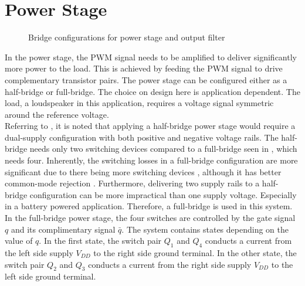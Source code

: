 \section{Power Stage} \label{sec:power_stage}
\begin{figure}[htbp]
	\centering
	\begin{subfigure}[b]{0.5\textwidth}
		\centering
		\begin{circuitikz}[>=Triangle, scale=0.8, font=\footnotesize]
			
		\end{circuitikz}
		\label{fig:power_stage_halfbridge}
	\end{subfigure}%
	\begin{subfigure}[b]{0.5\textwidth}
		\centering
		\begin{circuitikz}[>=Triangle, scale=0.8, font=\footnotesize]
			
		\end{circuitikz}
		\label{fig:power_stage_fullbridge}
	\end{subfigure}
	\caption{Bridge configurations for power stage and output filter}
	\label{fig:power_stage_top}
\end{figure}

In the power stage, the PWM signal needs to be amplified to deliver significantly more power to the load. This is achieved by feeding the PWM signal to drive complementary transistor pairs. The power stage can be configured either as a half-bridge or full-bridge. The choice on design here is application dependent. The load, a loudspeaker in this application, requires a voltage signal symmetric around the reference voltage. \\

Referring to , it is noted that applying a half-bridge power stage would require a dual-supply configuration with both positive and negative voltage rails. The half-bridge needs only two switching devices compared to a full-bridge seen in , which needs four. Inherently, the switching losses in a full-bridge configuration are more significant due to there being more switching devices \cite{multivar_ctrl_loops_for_SM_audio_systems}, although it has better common-mode rejection \cite{design_diff_filters_ti}. Furthermore, delivering two supply rails to a half-bridge configuration can be more impractical than one supply voltage. Especially in a battery powered application. Therefore, a full-bridge is used in this system. In the full-bridge power stage, the four switches are controlled by the gate signal $q$ and its complimentary signal $\bar{q}$. The system contains states depending on the value of $q$. In the first state, the switch pair $Q_{1}$ and $Q_{4}$ conducts a current from the left side supply $V_{DD}$ to the right side ground terminal. In the other state, the switch pair $Q_{2}$ and $Q_{3}$ conducts a current from the right side supply $V_{DD}$ to the left side ground terminal.

